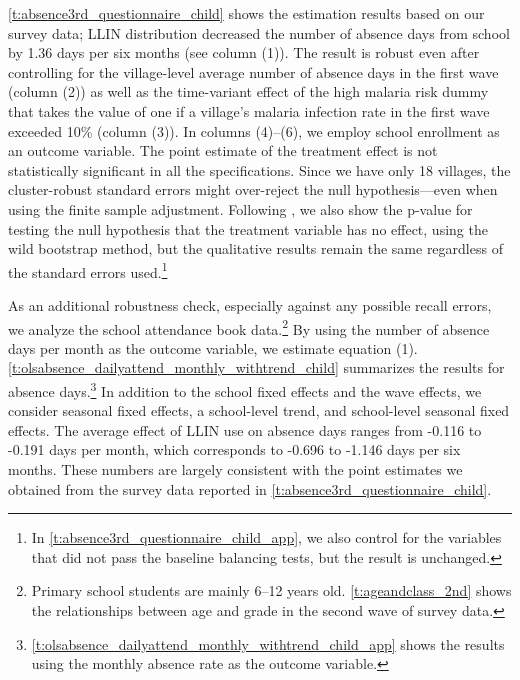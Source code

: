 \documentclass[fleqn,11pt]{article}
\begin{document}
\autoref{t:absence3rd_questionnaire_child} shows the estimation results based on our survey data; LLIN distribution decreased the number of absence days from school by 1.36 days per six months (see column (1)). The result is robust even after controlling for the village-level average number of absence days in the first wave (column (2)) as well as the time-variant effect of the high malaria risk dummy that takes the value of one if a village's malaria infection rate in the first wave exceeded 10\% (column (3)). In columns (4)--(6), we employ school enrollment as an outcome variable. The point estimate of the treatment effect is not statistically significant in all the specifications. Since we have only 18 villages, the cluster-robust standard errors might over-reject the null hypothesis---even when using the finite sample adjustment. Following \cite{cameron_bootstrap-based_2008}, we also show the p-value for testing the null hypothesis that the treatment variable has no effect, using the wild bootstrap method, but the qualitative results remain the same regardless of the standard errors used.\footnote{In \autoref{t:absence3rd_questionnaire_child_app}, we also control for the variables that did not pass the baseline balancing tests, but the result is unchanged.} 

As an additional robustness check, especially against any possible recall errors, we analyze the school attendance book data.\footnote{Primary school students are mainly 6--12 years old.
\autoref{t:ageandclass_2nd} shows the relationships between age and grade
in the second wave of survey data.} By using the number of absence days per month as the outcome variable, we estimate equation (1). 
\autoref{t:olsabsence_dailyattend_monthly_withtrend_child} summarizes the results for absence days.\footnote{\autoref{t:olsabsence_dailyattend_monthly_withtrend_child_app} shows the results using the monthly absence rate as the outcome variable.} In addition to the school fixed effects and the wave effects, we consider seasonal fixed effects, a school-level trend, and school-level seasonal fixed effects.
The average effect of LLIN use on absence days ranges from -0.116 to -0.191 days per month, which corresponds to -0.696 to -1.146 days per six months. These numbers are largely consistent with the point estimates we obtained from the survey data reported in \autoref{t:absence3rd_questionnaire_child}. 
 
\end{document}
